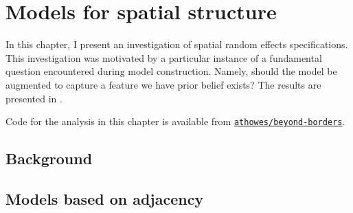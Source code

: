 \documentclass[a4paper, nobind]{templates/ociamthesis}
\begin{document}
\hypertarget{beyond-borders}{%
\chapter{Models for spatial structure}\label{beyond-borders}}

\adjustmtc
{}

In this chapter, I present an investigation of spatial random effects specifications.
This investigation was motivated by a particular instance of a fundamental question encountered during model construction.
Namely, should the model be augmented to capture a feature we have prior belief exists?
The results are presented in \textcite{howes2023beyond}.

Code for the analysis in this chapter is available from \href{https://github.com/athowes/beyond-borders}{\texttt{athowes/beyond-borders}}.

\hypertarget{background-1}{%
\section{Background}\label{background-1}}

\hypertarget{models-based-on-adjacency}{%
\section{Models based on adjacency}\label{models-based-on-adjacency}}
\end{document}
